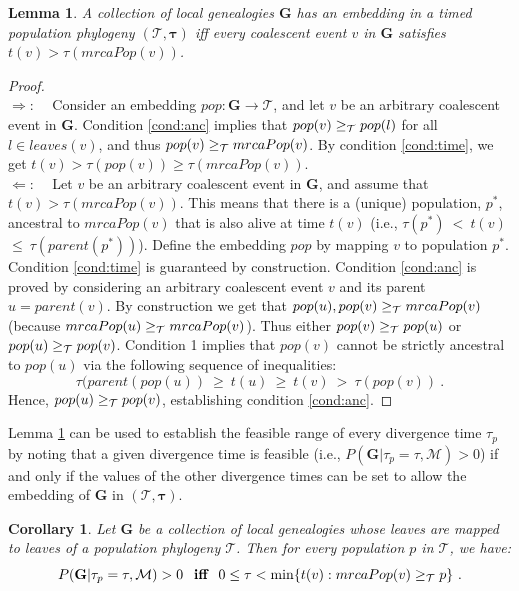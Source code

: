 \documentclass[11pt]{article}
\newcommand{\vect}[1]{\boldsymbol{\mathbf{#1}}}
\newcommand{\M}{\mathcal{M}}
\newcommand{\Tr}{\mathcal{T}}
\newcommand{\G}{\vect{G}}
\newcommand{\1}{\mathbbm{1}}
\newtheorem{lemma}{Lemma}
\newtheorem{corollary}{Corollary}
\newcommand{\taus}{\vect\tau}
\begin{document}
\begin{lemma}\label{lem:embed}
 A collection of local genealogies $\G$ has an embedding in a timed population phylogeny $(\Tr,\taus)$ iff every coalescent event $v$ in $\G$ satisfies $t(v) > \tau(mrcaPop(v))$.
\end{lemma}
\begin{proof}
 ~\\
 $\Rightarrow$:~~ Consider an embedding $pop:\G\rightarrow\Tr$, and let $v$ be an arbitrary coalescent event in $\G$.
 Condition \ref{cond:anc} implies that $pop(v)\anc pop(l)$ for all $l\in leaves(v)$, and thus $pop(v)\anc mrcaPop(v)$.
 By condition \ref{cond:time}, we get $t(v) > \tau(pop(v)) \geq \tau(mrcaPop(v))$.\\
 $\Leftarrow$:~~ Let $v$ be an arbitrary coalescent event in $\G$, and assume that $t(v) > \tau(mrcaPop(v))$. This means that there is a (unique) population, $p^*$,
 ancestral to $mrcaPop(v)$ that is also alive at time $t(v)$ (i.e., $\tau(p^*) ~<~ t(v)$\\
 $\leq~ \tau(parent(p^*))$). Define the embedding $pop$ by mapping $v$ to population $p^*$.
 Condition \ref{cond:time} is guaranteed by construction. 
 Condition \ref{cond:anc} is proved by considering an arbitrary coalescent event $v$ and its parent $u=parent(v)$.
 By construction we get that $pop(u),pop(v) \anc mrcaPop(v)$ (because $mrcaPop(u)\anc mrcaPop(v)$).
 Thus either $pop(v)\anc pop(u)$ or $pop(u)\anc pop(v)$.
 Condition 1  implies that $pop(v)$ cannot be strictly ancestral to $pop(u)$ via the following sequence of inequalities:
 $$\tau(parent(pop(u)) ~\geq~ t(u) ~\geq~ t(v) ~>~ \tau(pop(v))~.$$
 Hence, $pop(u)\anc pop(v)$, establishing condition \ref{cond:anc}.
\end{proof}

Lemma \ref{lem:embed} can be used to establish the feasible range of every divergence time $\tau_p$ by noting that a given divergence time
is feasible (i.e., $P(\G|\tau_p=\tau,\M)>0$) if and only if the values of the other divergence times can be set to allow the embedding of $\G$ in $(\Tr,\taus)$.

\begin{corollary}\label{cor:tau_bound}
 Let $\G$ be a  collection of local genealogies whose leaves are mapped to leaves of a population phylogeny $\Tr$. Then for every population $p$ in $\Tr$, we have:
 $$P(\G|\tau_p=\tau,\M)>0 \textbf{~~iff~~}  0\leq \tau < \min \{t(v):mrcaPop(v)\anc p\} ~.$$
\end{corollary}
\end{document}

